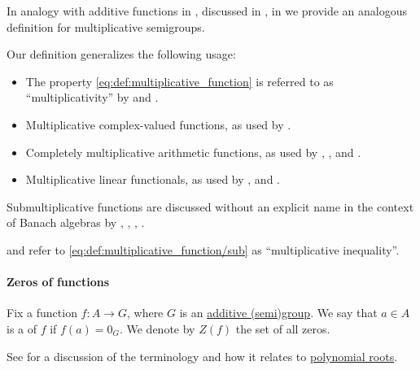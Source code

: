 \begin{remark}\label{rem:multiplicative_function_terminology}
  In analogy with additive functions in , discussed in , in  we provide an analogous definition for multiplicative semigroups.

  Our definition generalizes the following usage:
  \begin{itemize}
    \item The property \eqref{eq:def:multiplicative_function} is referred to as \enquote{multiplicativity} by  and .

    \item Multiplicative complex-valued functions, as used by .

    \item Completely multiplicative arithmetic functions, as used by ,
    ,
     and .

    \item Multiplicative linear functionals, as used by ,
     and .
  \end{itemize}

  Submultiplicative functions are discussed without an explicit name in the context of Banach algebras by
  ,
  ,
  ,
  .

   and  refer to \eqref{eq:def:multiplicative_function/sub} as \enquote{multiplicative inequality}.
\end{remark}

\paragraph{Zeros of functions}

\begin{definition}\label{def:zero_of_function}\mimprovised
  Fix a function \( f: A \to G \), where \( G \) is an \hyperref[con:additive_semigroup]{additive (semi)group}. We say that \( a \in A \) is a  of \( f \) if \( f(a) = 0_G \). We denote by \( Z(f) \) the set of all zeros.
\end{definition}
\begin{comments}
  \item See  for a discussion of the terminology and how it relates to \hyperref[def:root_of_polynomial]{polynomial roots}.
\end{comments}

